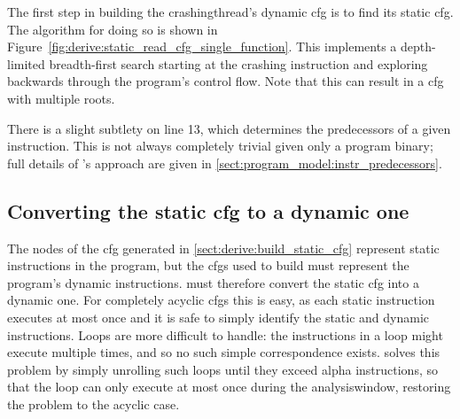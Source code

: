 The first step in building the \gls{crashingthread}'s dynamic
\gls{cfg} is to find its static \gls{cfg}.  The algorithm for doing so
is shown in Figure~\ref{fig:derive:static_read_cfg_single_function}.
This implements a depth-limited breadth-first search starting at the
crashing instruction and exploring backwards through the program's
control flow.  Note that this can result in a \gls{cfg} with multiple
roots.

There is a slight subtlety on line 13, which determines the
predecessors of a given instruction.  This is not always completely
trivial given only a program binary; full details of {\technique}'s
approach are given in \autoref{sect:program_model:instr_predecessors}.

\subsection[Converting the static \glsentrytext{cfg} to a dynamic one]{Converting the static \gls{cfg} to a dynamic one}
\label{sect:derive:handling_loops}

The nodes of the \gls{cfg} generated in
\autoref{sect:derive:build_static_cfg} represent static instructions
in the program, but the \glspl{cfg} used to build {\StateMachines}
must represent the program's dynamic instructions.  {\Technique} must
therefore convert the static \gls{cfg} into a dynamic one.  For
completely acyclic \glspl{cfg} this is easy, as each static
instruction executes at most once and it is safe to simply identify
the static and dynamic instructions.  Loops are more difficult to
handle: the instructions in a loop might execute multiple times, and
so no such simple correspondence exists.  {\Technique} solves this
problem by simply unrolling such loops until they exceed \gls{alpha}
instructions, so that the
loop can only execute at most once during the \gls{analysiswindow},
restoring the problem to the acyclic case.

